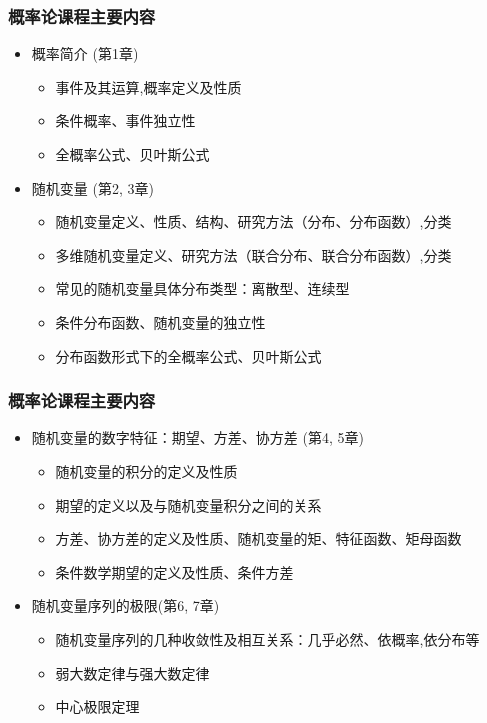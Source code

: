 \documentclass[Prob-All.tex]{subfiles}
\begin{document}
\begin{frame}
	\frametitle{概率论课程主要内容}
	\begin{itemize}[<+-|alert@+>]
		\item 概率简介 (第1章)
			\begin{itemize}[<+-|alert@+>]
			\item  事件及其运算,概率定义及性质
			\item 条件概率、事件独立性
			\item 全概率公式、贝叶斯公式
		\end{itemize}
	\item 随机变量 (第2, 3章)
	\begin{itemize}[<+-|alert@+>]
		\item  随机变量定义、性质、结构、研究方法（分布、分布函数）,分类
		\item 多维随机变量定义、研究方法（联合分布、联合分布函数）,分类
		\item 常见的随机变量具体分布类型：离散型、连续型
		\item 条件分布函数、随机变量的独立性
		\item 分布函数形式下的全概率公式、贝叶斯公式
	\end{itemize}
	\end{itemize}
\end{frame}


\begin{frame}
	\frametitle{概率论课程主要内容}
	\begin{itemize}[<+-|alert@+>]

		\item 随机变量的数字特征：期望、方差、协方差 (第4, 5章)
		\begin{itemize}[<+-|alert@+>]
			\item  随机变量的积分的定义及性质
			\item 期望的定义以及与随机变量积分之间的关系
			\item  方差、协方差的定义及性质、随机变量的矩、特征函数、矩母函数
			\item  条件数学期望的定义及性质、条件方差
		\end{itemize}
		\item 随机变量序列的极限(第6, 7章)
		\begin{itemize}[<+-|alert@+>]
			\item  随机变量序列的几种收敛性及相互关系：几乎必然、依概率,依分布等
			\item 弱大数定律与强大数定律
			\item  中心极限定理
		\end{itemize}
	\end{itemize}
\end{frame}
\end{document}
